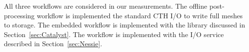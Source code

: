 All three workflows are considered in our measurements.  The offline
post-processing workflow is implemented the standard CTH I/O to write full
meshes to storage.  The embedded \insitu workflow is implemented with the
 \insitu library discussed in
Section~\ref{sec:Catalyst}.  The \intransit workflow is implemented with
the  I/O service described in Section~\ref{sec:Nessie}.
